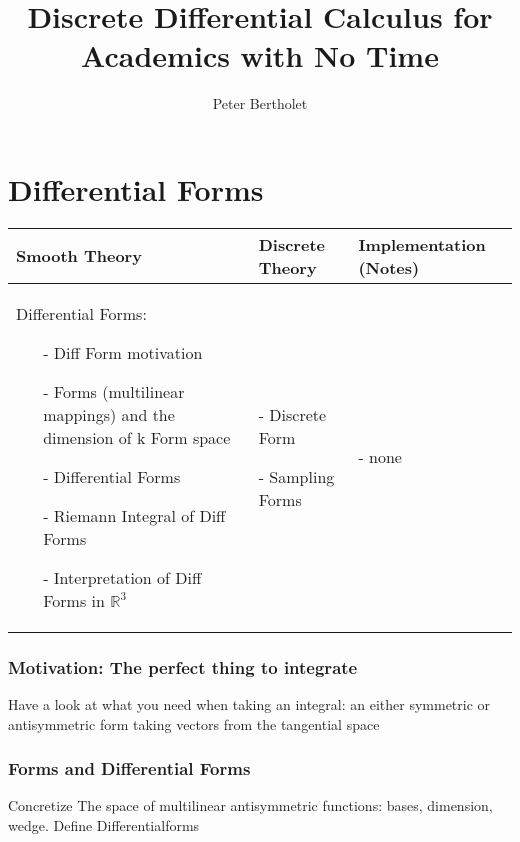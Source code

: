 \documentclass[draft]{scrbook}
\title{Discrete Differential Calculus for Academics with No Time}
\author{Peter Bertholet}
\newenvironment{packed_enum}{
\begin{enumerate}
  \setlength{\itemsep}{1pt}
  \setlength{\parskip}{0pt}
  \setlength{\parsep}{0pt}
}{\end{enumerate}}
\begin{document}
	\maketitle
	\tableofcontents
	
	

	





\newpage
\chapter{Differential Forms}
	\begin{longtable}{|p{4.5cm}|p{4.5cm}|p{4.5cm}|}
		\hline
		Smooth Theory& Discrete Theory& Implementation (Notes)\\
		\hline
			Differential Forms: \begin{itemize}
			  \setlength{\itemsep}{1pt}
			  \setlength{\parskip}{0pt}
				\setlength{\parsep}{0pt}
				\item[-]Diff Form motivation
				\item[-]Forms (multilinear mappings) and the dimension of k Form space 
				\item[-]Differential Forms 
				\item[-]Riemann Integral of Diff Forms 
				\item[-]Interpretation of Diff Forms in $\mathbb R^3$ 
			\end{itemize}
			&
			\begin{packed_enum}
				\item[-] Discrete Form
				\item[-] Sampling Forms
			\end{packed_enum}
			 & - none
			 \\		
		\hline
	\end{longtable}
	\subsection{Motivation: The perfect thing to integrate}
		Have a look at what you need when taking an integral: an either symmetric or antisymmetric form taking
		vectors from the tangential space
	\subsection{Forms and Differential Forms}
		Concretize The space of multilinear antisymmetric functions: bases, dimension, wedge. Define Differentialforms
\end{document}
